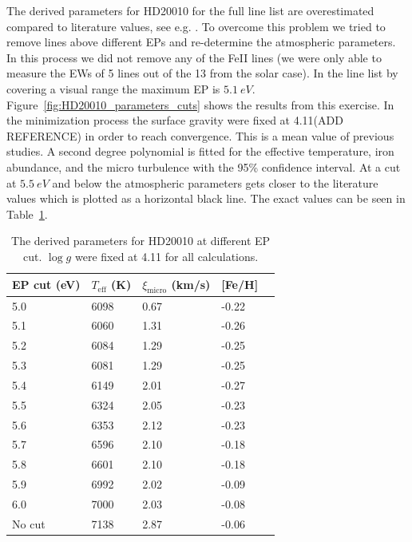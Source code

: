 \documentclass{aa}
\begin{document}
The derived parameters for HD20010 for the full line list
are overestimated compared to literature values, see e.g.
\citet{Mortier2013,Lebzelter2012}. To overcome this problem we tried
to remove lines above different EPs and re-determine the atmospheric
parameters. In this process we did not remove any of the FeII
lines (we were only able to measure the EWs of 5 lines out of the
13 from the solar case). In the line list by \cite{Tsantaki2013}
covering a visual range the maximum EP is $\SI{5.1}{eV}$.
Figure~\ref{fig:HD20010_parameters_cuts} shows the results from this
exercise. In the minimization process the surface gravity were fixed
at 4.11(ADD REFERENCE) in order to reach convergence. This is a mean
value of previous studies. A second degree polynomial is fitted for the
effective temperature, iron abundance, and the micro turbulence with
the 95\% confidence interval. At a cut at $\SI{5.5}{eV}$ and below the
atmospheric parameters gets closer to the literature values which is
plotted as a horizontal black line. The exact values can be seen in
Table~\ref{tab:hd20010}.

\begin{table}[htb!]
    \caption{The derived parameters for HD20010 at different EP cut. $\log g$
    were fixed at 4.11 for all calculations.}
    \label{tab:hd20010}
    \centering
    \begin{tabular}{lllll}
      \hline\hline
        EP cut (eV) & $T_\mathrm{eff}$ (K) & $\xi_\mathrm{micro}$ (km/s) & [Fe/H] \\
      \hline
      5.0           & 6098                 & 0.67                        & -0.22   \\
      5.1           & 6060                 & 1.31                        & -0.26   \\
      5.2           & 6084                 & 1.29                        & -0.25   \\
      5.3           & 6081                 & 1.29                        & -0.25   \\
      5.4           & 6149                 & 2.01                        & -0.27   \\
      5.5           & 6324                 & 2.05                        & -0.23   \\
      5.6           & 6353                 & 2.12                        & -0.23   \\
      5.7           & 6596                 & 2.10                        & -0.18   \\
      5.8           & 6601                 & 2.10                        & -0.18   \\
      5.9           & 6992                 & 2.02                        & -0.09   \\
      6.0           & 7000                 & 2.03                        & -0.08   \\
      No cut        & 7138                 & 2.87                        & -0.06   \\
      \hline
    \end{tabular}
\end{table}
\end{document}
